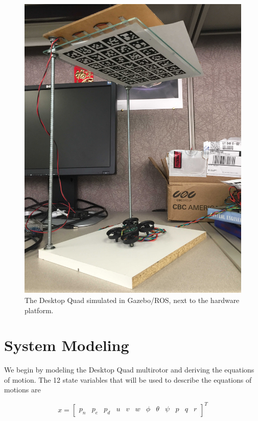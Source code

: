 \documentclass[12pt]{article}
\begin{document}
\begin{figure}[H]
	\includegraphics[scale=0.07]{platform}
	\endminipage\hfill
	\caption{The Desktop Quad simulated in Gazebo/ROS, next to the hardware platform.}
	\label{fig:sim_pic}
\end{figure}

\section{System Modeling}
We begin by modeling the Desktop Quad multirotor and deriving the equations of motion. The 12 state variables that will be used to describe the equations of motions are

\begin{equation*}
x =
\begin{bmatrix}
p_n & p_e & p_d & u & v & w & \phi & \theta & \psi & p & q & r
\end{bmatrix}
^T
\end{equation*}
\end{document}
